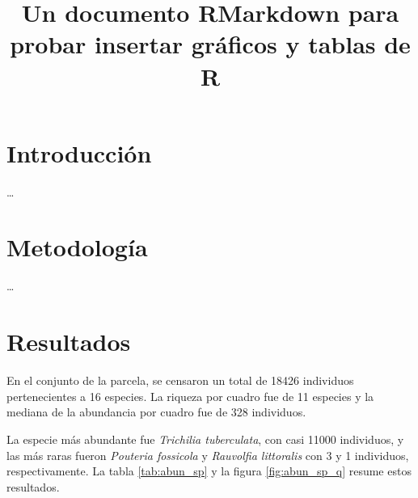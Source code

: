 \documentclass[11pt,]{article}
\title{Un documento RMarkdown para probar insertar gráficos y tablas de R  }
\author{\Large \vspace{0.05in} \newline\normalsize\emph{}  }
\date{}
\newcommand*{\authorfont}{\fontfamily{phv}\selectfont}
\begin{document}
	
%

{%
\setlength{\parindent}{0pt}
\thispagestyle{plain}
{\fontsize{18}{20}\selectfont\raggedright 
\maketitle  %

}

{
   \vskip 13.5pt\relax \normalsize\fontsize{11}{12} 
\textbf{\authorfont } \hskip 15pt \emph{\small }   

}

}






\vskip 6.5pt


\noindent  \hypertarget{introducciuxf3n}{%
\section{Introducción}\label{introducciuxf3n}}

\ldots

\hypertarget{metodologuxeda}{%
\section{Metodología}\label{metodologuxeda}}

\ldots

\hypertarget{resultados}{%
\section{Resultados}\label{resultados}}

En el conjunto de la parcela, se censaron un total de 18426 individuos
pertenecientes a 16 especies. La riqueza por cuadro fue de 11 especies y
la mediana de la abundancia por cuadro fue de 328 individuos.

La especie más abundante fue \emph{Trichilia tuberculata}, con casi
11000 individuos, y las más raras fueron \emph{Pouteria fossicola} y
\emph{Rauvolfia littoralis} con 3 y 1 individuos, respectivamente. La
tabla \ref{tab:abun_sp} y la figura \ref{fig:abun_sp_q} resume estos
resultados.
\end{document}
